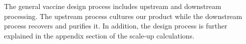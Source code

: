 The general vaccine design process includes upstream and downstream processing. The upstream process cultures our product while the downstream process recovers and purifies it. In addition, the design process is further explained in the appendix section of the scale-up calculations. 